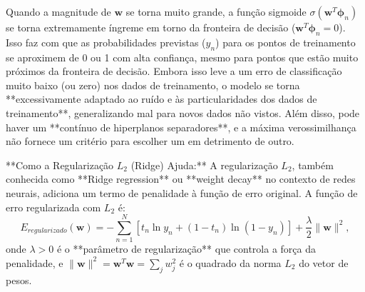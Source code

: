 \documentclass{article}
\begin{document}
Quando a magnitude de $\mathbf{w}$ se torna muito grande, a função sigmoide $\sigma(\mathbf{w}^T \boldsymbol{\phi}_n)$ se torna extremamente íngreme em torno da fronteira de decisão ($\mathbf{w}^T \boldsymbol{\phi}_n = 0$). Isso faz com que as probabilidades previstas ($y_n$) para os pontos de treinamento se aproximem de 0 ou 1 com alta confiança, mesmo para pontos que estão muito próximos da fronteira de decisão. Embora isso leve a um erro de classificação muito baixo (ou zero) nos dados de treinamento, o modelo se torna **excessivamente adaptado ao ruído e às particularidades dos dados de treinamento**, generalizando mal para novos dados não vistos. Além disso, pode haver um **contínuo de hiperplanos separadores**, e a máxima verossimilhança não fornece um critério para escolher um em detrimento de outro.

**Como a Regularização $L_2$ (Ridge) Ajuda:** A regularização $L_2$, também conhecida como **Ridge regression** ou **weight decay** no contexto de redes neurais, adiciona um termo de penalidade à função de erro original. A função de erro regularizada com $L_2$ é:
\[
E_{regularizado}(\mathbf{w}) = -\sum_{n=1}^{N} \left[ t_n \ln y_n + (1 - t_n) \ln(1 - y_n) \right] + \frac{\lambda}{2} \|\mathbf{w}\|^2,
\]
onde $\lambda > 0$ é o **parâmetro de regularização** que controla a força da penalidade, e $\|\mathbf{w}\|^2 = \mathbf{w}^T \mathbf{w} = \sum_{j} w_j^2$ é o quadrado da norma $L_2$ do vetor de pesos.
\end{document}
